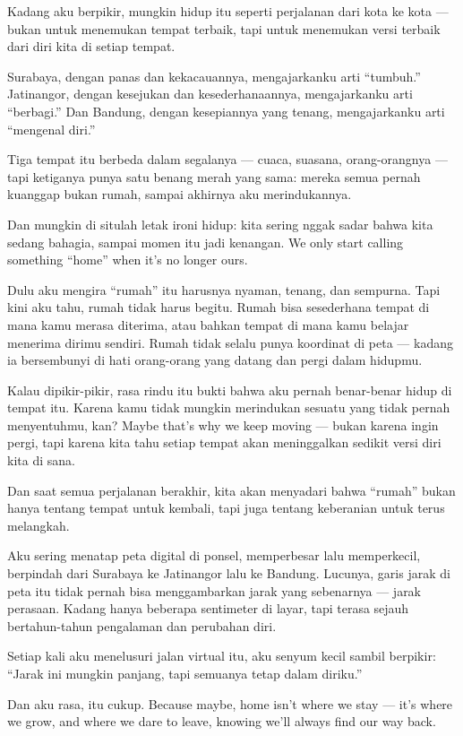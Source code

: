 \documentclass[
  letterpaper,
  DIV=11,
  numbers=noendperiod]{scrreprt}
\begin{document}
Kadang aku berpikir, mungkin hidup itu seperti perjalanan dari kota ke
kota --- bukan untuk menemukan tempat terbaik, tapi untuk menemukan
versi terbaik dari diri kita di setiap tempat.

Surabaya, dengan panas dan kekacauannya, mengajarkanku arti ``tumbuh.''
Jatinangor, dengan kesejukan dan kesederhanaannya, mengajarkanku arti
``berbagi.'' Dan Bandung, dengan kesepiannya yang tenang, mengajarkanku
arti ``mengenal diri.''

Tiga tempat itu berbeda dalam segalanya --- cuaca, suasana,
orang-orangnya --- tapi ketiganya punya satu benang merah yang sama:
mereka semua pernah kuanggap bukan rumah, sampai akhirnya aku
merindukannya.

Dan mungkin di situlah letak ironi hidup: kita sering nggak sadar bahwa
kita sedang bahagia, sampai momen itu jadi kenangan. We only start
calling something ``home'' when it's no longer ours.

Dulu aku mengira ``rumah'' itu harusnya nyaman, tenang, dan sempurna.
Tapi kini aku tahu, rumah tidak harus begitu. Rumah bisa sesederhana
tempat di mana kamu merasa diterima, atau bahkan tempat di mana kamu
belajar menerima dirimu sendiri. Rumah tidak selalu punya koordinat di
peta --- kadang ia bersembunyi di hati orang-orang yang datang dan pergi
dalam hidupmu.

Kalau dipikir-pikir, rasa rindu itu bukti bahwa aku pernah benar-benar
hidup di tempat itu. Karena kamu tidak mungkin merindukan sesuatu yang
tidak pernah menyentuhmu, kan? Maybe that's why we keep moving --- bukan
karena ingin pergi, tapi karena kita tahu setiap tempat akan
meninggalkan sedikit versi diri kita di sana.

Dan saat semua perjalanan berakhir, kita akan menyadari bahwa ``rumah''
bukan hanya tentang tempat untuk kembali, tapi juga tentang keberanian
untuk terus melangkah.

Aku sering menatap peta digital di ponsel, memperbesar lalu memperkecil,
berpindah dari Surabaya ke Jatinangor lalu ke Bandung. Lucunya, garis
jarak di peta itu tidak pernah bisa menggambarkan jarak yang sebenarnya
--- jarak perasaan. Kadang hanya beberapa sentimeter di layar, tapi
terasa sejauh bertahun-tahun pengalaman dan perubahan diri.

Setiap kali aku menelusuri jalan virtual itu, aku senyum kecil sambil
berpikir: ``Jarak ini mungkin panjang, tapi semuanya tetap dalam
diriku.''

Dan aku rasa, itu cukup. Because maybe, home isn't where we stay ---
it's where we grow, and where we dare to leave, knowing we'll always
find our way back.
\end{document}
